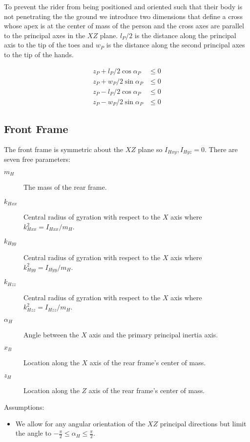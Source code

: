 \documentclass{article}
\begin{document}
To prevent the rider from being positioned and oriented such that their body is
not penetrating the the ground we introduce two dimensions that define a cross
whose apex is at the center of mass of the person and the cross axes are
parallel to the principal axes in the $XZ$ plane. $l_P / 2$ is the distance
along the principal axis to the tip of the toes and $w_P$ is the distance along
the second principal axes to the tip of the hands.

\begin{align}
  z_P + l_P / 2 \cos{\alpha_P} & \leq 0 \\
  z_P + w_P / 2 \sin{\alpha_P} & \leq 0 \\
  z_P - l_P / 2 \cos{\alpha_P} & \leq 0 \\
  z_P - w_P / 2 \sin{\alpha_P} & \leq 0
\end{align}

\subsection{Front Frame}

The front frame is symmetric about the $XZ$ plane so $I_{Hxy}, I_{Hyz} = 0$.
There are seven free parameters:

\begin{description}
  \item[$m_H$] The mass of the rear frame.
  \item[$k_{Hxx}$] Central radius of gyration with respect to the $X$ axis
    where $k_{Hxx}^2=I_{Hxx} / m_H$.
  \item[$k_{Hyy}$] Central radius of gyration with respect to the $X$ axis
    where $k_{Hyy}^2=I_{Hyy} / m_H$.
  \item[$k_{Hzz}$] Central radius of gyration with respect to the $X$ axis
    where $k_{Hzz}^2=I_{Hzz} / m_H$.
  \item[$\alpha_H$] Angle between the $X$ axis and the primary principal
    inertia axis.
  \item[$x_B$] Location along the $X$ axis of the rear frame's center of mass.
  \item[$z_H$] Location along the $Z$ axis of the rear frame's center of mass.
\end{description}

Assumptions:

\begin{itemize}
  \item We allow for any angular orientation of the $XZ$ principal directions
    but limit the angle to $-\frac{\pi}{2} \leq \alpha_H \leq \frac{\pi}{2}$.
\end{itemize}
\end{document}
